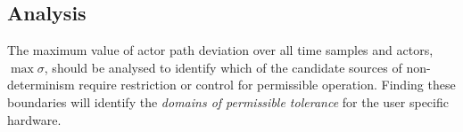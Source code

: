 \documentclass[letterpaper, 10 pt, journal, twoside]{IEEEtran}
\begin{document}
\subsection{Analysis}
The maximum value of actor path deviation over all time samples and actors, $\max\sigma$, should be analysed to identify which of the candidate sources of non-determinism require restriction or control for permissible operation. Finding these boundaries will identify the \textit{domains of permissible tolerance} for the user specific hardware.







\end{document}
